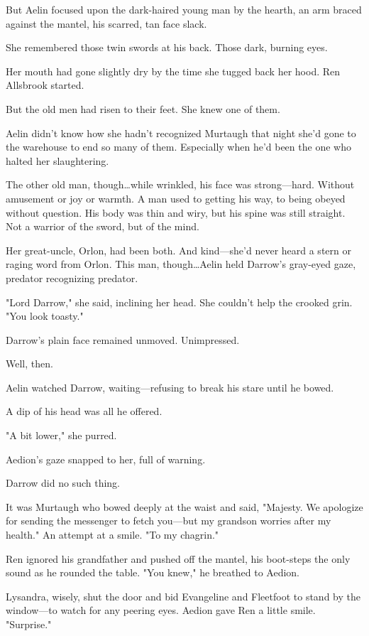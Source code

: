 But Aelin focused upon the dark-haired young man by the hearth, an arm braced against the mantel, his scarred, tan face slack.

She remembered those twin swords at his back. 
Those dark, burning eyes.

Her mouth had gone slightly dry by the time she tugged back her hood. 
Ren Allsbrook started.

But the old men had risen to their feet.
She knew one of them.

Aelin didn't know how she hadn't recognized Murtaugh that night she'd gone to the warehouse to end so many of them. 
Especially when he'd been the one who halted her slaughtering.

The other old man, though\ldots while wrinkled, his face was strong---hard. 
Without amusement or joy or warmth. 
A man used to getting his way, to being obeyed without question. 
His body was thin and wiry, but his spine was still straight. 
Not a warrior of the sword, but of the mind.

Her great-uncle, Orlon, had been both. 
And kind---she'd never heard a stern or raging word from Orlon. 
This man, though\ldots Aelin held Darrow's gray-eyed gaze, predator recognizing predator.

"Lord Darrow," she said, inclining her head. 
She couldn't help the crooked grin. 
"You look toasty."

Darrow's plain face remained unmoved.
Unimpressed.

Well, then.

Aelin watched Darrow, waiting---refusing to break his stare until he bowed.

A dip of his head was all he offered.

"A bit lower," she purred.

Aedion's gaze snapped to her, full of warning.

Darrow did no such thing.

It was Murtaugh who bowed deeply at the waist and said, "Majesty. 
We apologize for sending the messenger to fetch you---but my grandson worries after my health." 
An attempt at a smile. 
"To my chagrin."

Ren ignored his grandfather and pushed off the mantel, his boot-steps the only sound as he rounded the table.
"You knew," he breathed to Aedion.

Lysandra, wisely, shut the door and bid Evangeline and Fleetfoot to stand by the window---to watch for any peering eyes. 
Aedion gave Ren a little smile. 
"Surprise."


